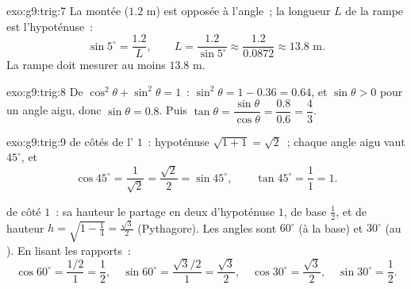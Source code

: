 \begin{solution}{exo:g9:trig:7}
La montée ($1.2$ m) est opposée à l'angle~; la longueur $L$ de la rampe
est l'hypoténuse~:
\[
\sin 5^\circ = \frac{1.2}{L},
\qquad
L = \frac{1.2}{\sin 5^\circ} \approx \frac{1.2}{0.0872} \approx 13.8
\text{ m}.
\]
La rampe doit mesurer au moins $13.8$ m.
\end{solution}

\begin{solution}{exo:g9:trig:8}
De $\cos^2\theta + \sin^2\theta = 1$~:
$\sin^2\theta = 1 - 0.36 = 0.64$, et $\sin\theta > 0$ pour un angle
aigu, donc $\sin\theta = 0.8$. Puis
$\tan\theta = \dfrac{\sin\theta}{\cos\theta} = \dfrac{0.8}{0.6} =
\dfrac43$.
\end{solution}

\begin{solution}{exo:g9:trig:9}
\emph{ } de côtés de l' $1$~:
hypoténuse $\sqrt{1 + 1} = \sqrt2$~; chaque angle aigu vaut $45^\circ$,
et
\[
\cos 45^\circ = \frac{1}{\sqrt2} = \frac{\sqrt2}{2} = \sin 45^\circ,
\qquad
\tan 45^\circ = \frac11 = 1 .
\]

\emph{} de côté $1$~: sa hauteur le partage en deux
 d'hypoténuse $1$, de base $\frac12$, et de hauteur
$h = \sqrt{1 - \frac14} = \frac{\sqrt3}{2}$ (Pythagore). Les angles
sont $60^\circ$ (à la base) et $30^\circ$ (au ). En lisant les
rapports~:
\[
\cos 60^\circ = \frac{1/2}{1} = \frac12, \quad
\sin 60^\circ = \frac{\sqrt3/2}{1} = \frac{\sqrt3}{2}, \quad
\cos 30^\circ = \frac{\sqrt3}{2}, \quad
\sin 30^\circ = \frac12 .
\]
\end{solution}

